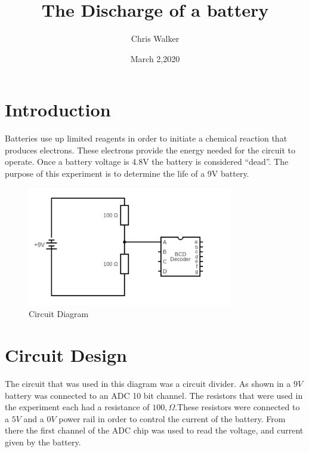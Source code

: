 \documentclass[12pt]{article}
\title{The Discharge of a battery}
\author{Chris Walker}
\date{March 2,2020}
\begin{document}
\maketitle

\section{Introduction}
Batteries use up limited reagents in order to initiate a chemical reaction that produces electrons. These electrons provide the energy needed for the circuit to operate. Once a battery voltage is 4.8V the battery is considered “dead”.
The purpose of this experiment is to determine the life of a 9V battery.

\begin{figure}[h]
\begin{center}
\includegraphics[width=0.8\textwidth]{Circuit_Design}
\caption{Circuit Diagram}
\label{fig:circuit}
\end{center}
\end{figure}

\section{Circuit Design}
The circuit that was used in this diagram was a circuit divider. As shown in  a $9V$ battery was connected to an ADC 10 bit channel. The resistors that were used in the experiment each had a resistance of $100,\Omega$.These resistors were connected to a $5V$ and a $0V$ power rail in order to control the current of the battery. From there the first channel of the ADC chip was used to read the voltage, and current given by the battery.
\end{document}
